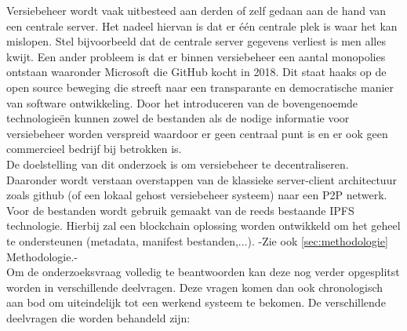 \noindent Versiebeheer wordt vaak uitbesteed aan derden of zelf gedaan aan de hand van een centrale server. Het nadeel hiervan is dat er één centrale plek is waar het kan mislopen. Stel bijvoorbeeld dat de centrale server gegevens verliest is men alles kwijt. Een ander probleem is dat er binnen versiebeheer een aantal monopolies ontstaan waaronder Microsoft die GitHub kocht in 2018.  Dit staat haaks op de open source beweging die streeft naar een transparante en democratische manier van software ontwikkeling. Door het introduceren van de bovengenoemde technologieën kunnen zowel de bestanden als de nodige informatie voor versiebeheer worden verspreid waardoor er geen centraal punt is en er ook geen commercieel bedrijf bij betrokken is.\\

\noindent De doelstelling van dit onderzoek is om versiebeheer te decentraliseren. Daaronder wordt verstaan overstappen van de klassieke server-client architectuur zoals github (of een lokaal gehost versiebeheer systeem) naar een P2P netwerk. Voor de bestanden wordt gebruik gemaakt van de reeds bestaande IPFS technologie. Hierbij zal een blockchain oplossing worden ontwikkeld om het geheel te ondersteunen (metadata, manifest bestanden,...). -Zie ook \ref{sec:methodologie} Methodologie.-\\

\noindent Om de onderzoeksvraag volledig te beantwoorden kan deze nog verder opgesplitst worden in verschillende deelvragen. Deze vragen komen dan ook chronologisch aan bod om uiteindelijk tot een werkend systeem te bekomen. De verschillende deelvragen die worden behandeld zijn:

